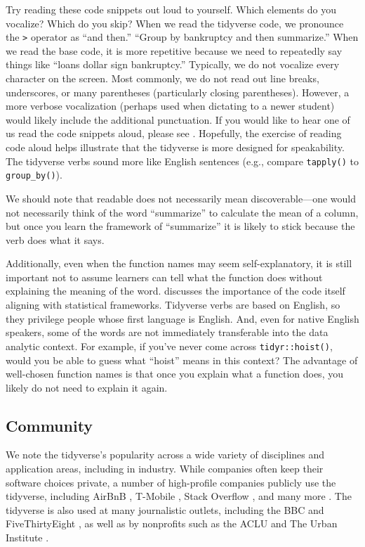 \documentclass[12pt]{article}
\begin{document}
Try reading these code snippets out loud to yourself. Which elements do
you vocalize? Which do you skip? When we read the tidyverse code, we
pronounce the \texttt{\textbar{}\textgreater{}} operator as ``and
then.'' ``Group by bankruptcy and then summarize.'' When we read the
base code, it is more repetitive because we need to repeatedly say
things like ``loans dollar sign bankruptcy.'' Typically, we do not
vocalize every character on the screen. Most commonly, we do not read
out line breaks, underscores, or many parentheses (particularly closing
parentheses). However, a more verbose vocalization (perhaps used when
dictating to a newer student) would likely include the additional
punctuation. If you would like to hear one of us read the code snippets
aloud, please see \citet{mcnamara2021}. Hopefully, the exercise of
reading code aloud helps illustrate that the tidyverse is more designed
for speakability. The tidyverse verbs sound more like English sentences
(e.g., compare \texttt{tapply()} to \texttt{group\_by()}).

We should note that readable does not necessarily mean
discoverable---one would not necessarily think of the word ``summarize''
to calculate the mean of a column, but once you learn the framework of
``summarize'' it is likely to stick because the verb does what it says.

Additionally, even when the function names may seem self-explanatory, it
is still important not to assume learners can tell what the function
does without explaining the meaning of the word. \citet{thoma2021}
discusses the importance of the code itself aligning with statistical
frameworks. Tidyverse verbs are based on English, so they privilege
people whose first language is English. And, even for native English
speakers, some of the words are not immediately transferable into the
data analytic context. For example, if you've never come across
\texttt{tidyr::hoist()}, would you be able to guess what ``hoist'' means
in this context? The advantage of well-chosen function names is that
once you explain what a function does, you likely do not need to explain
it again.

\hypertarget{sec:community}{%
\subsection{Community}\label{sec:community}}

We note the tidyverse's popularity across a wide variety of disciplines
and application areas, including in industry. While companies often keep
their software choices private, a number of high-profile companies
publicly use the tidyverse, including AirBnB \citep{bion_how_2018},
T-Mobile \citep{nolis_were_2020}, Stack Overflow
\citep{robinson_exploring_2015}, and many more
\citep{rstudio_pbc_rstudio_nodate}. The tidyverse is also used at many
journalistic outlets, including the BBC
\citep{bbc_visual_and_data_journalism_how_2019} and FiveThirtyEight
\citep{flowers_fivethirtyeights_2016}, as well as by nonprofits such as
the ACLU \citep{watson_r_2019} and The Urban Institute
\citep{dataurban_building_2019}.
\end{document}

